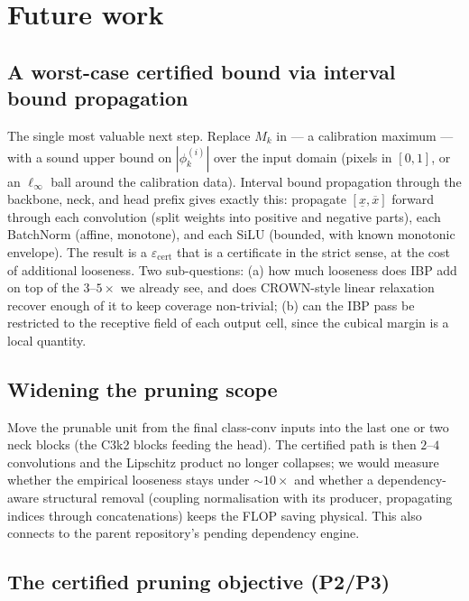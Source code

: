 \documentclass[11pt]{article}
\newcommand{\epscert}{\varepsilon_{\mathrm{cert}}}
\theoremstyle{definition}
\theoremstyle{plain}
\begin{document}
\section{Future work}
\label{sec:future}

\subsection{A worst-case certified bound via interval bound propagation}
\label{sec:future-ibp}

The single most valuable next step. Replace $M_k$ in  --- a
calibration maximum --- with a sound upper bound on $|\phi_k^{(i)}|$ over the
input domain (pixels in $[0,1]$, or an $\ell_\infty$ ball around the calibration
data). Interval bound propagation through the backbone, neck, and head prefix
gives exactly this: propagate $[\underline{x}, \overline{x}]$ forward through
each convolution (split weights into positive and negative parts), each
BatchNorm (affine, monotone), and each SiLU (bounded, with known monotonic
envelope). The result is a $\epscert$ that is a certificate in the strict sense,
at the cost of additional looseness. Two sub-questions: (a) how much looseness
does IBP add on top of the $3$--$5\times$ we already see, and does CROWN-style
linear relaxation recover enough of it to keep coverage non-trivial; (b) can the
IBP pass be restricted to the receptive field of each output cell, since the
cubical margin is a local quantity.

\subsection{Widening the pruning scope}

Move the prunable unit from the final class-conv inputs into the last one or two
neck blocks (the C3k2 blocks feeding the head). The certified path is then
$2$--$4$ convolutions and the Lipschitz product no longer collapses; we would
measure whether the empirical looseness stays under $\sim\!10\times$ and whether
a dependency-aware structural removal (coupling normalisation with its producer,
propagating indices through concatenations) keeps the FLOP saving physical. This
also connects to the parent repository's pending dependency engine.

\subsection{The certified pruning objective (P2/P3)}
\end{document}
